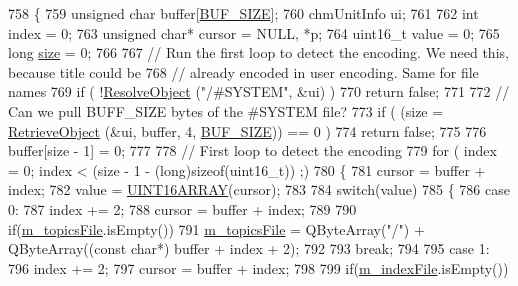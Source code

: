 \begin{DoxyCode}
758 \{
759     \textcolor{keywordtype}{unsigned} \textcolor{keywordtype}{char} buffer[\hyperlink{libchmfileimpl_8cpp_a6821bafc3c88dfb2e433a095df9940c6}{BUF\_SIZE}];
760     chmUnitInfo ui;
761     
762     \textcolor{keywordtype}{int} index = 0;
763     \textcolor{keywordtype}{unsigned} \textcolor{keywordtype}{char}* cursor = NULL, *p;
764     uint16\_t value = 0;
765     \textcolor{keywordtype}{long} \hyperlink{synctex__parser_8c_aa23c661441688350614bd6a350d2b6ff}{size} = 0;
766 
767     \textcolor{comment}{// Run the first loop to detect the encoding. We need this, because title could be}
768     \textcolor{comment}{// already encoded in user encoding. Same for file names}
769     \textcolor{keywordflow}{if} ( !\hyperlink{classLCHMFileImpl_a78d3e549251cd4c842aecca5aa1ede36}{ResolveObject} (\textcolor{stringliteral}{"/#SYSTEM"}, &ui) )
770         \textcolor{keywordflow}{return} \textcolor{keyword}{false};
771 
772     \textcolor{comment}{// Can we pull BUFF\_SIZE bytes of the #SYSTEM file?}
773     \textcolor{keywordflow}{if} ( (size = \hyperlink{classLCHMFileImpl_a8535dce5eb8f22161ecf3510fde8aa4e}{RetrieveObject} (&ui, buffer, 4, \hyperlink{libchmfileimpl_8cpp_a6821bafc3c88dfb2e433a095df9940c6}{BUF\_SIZE})) == 0 )
774         \textcolor{keywordflow}{return} \textcolor{keyword}{false};
775 
776     buffer[size - 1] = 0;
777 
778     \textcolor{comment}{// First loop to detect the encoding}
779     \textcolor{keywordflow}{for} ( index = 0; index < (size - 1 - (long)\textcolor{keyword}{sizeof}(uint16\_t)) ;)
780     \{
781         cursor = buffer + index;
782         value = \hyperlink{bitfiddle_8h_a4cdadd3f542d83f288d0b415c397fbb9}{UINT16ARRAY}(cursor);
783 
784         \textcolor{keywordflow}{switch}(value)
785         \{
786             \textcolor{keywordflow}{case} 0:
787                 index += 2;
788                 cursor = buffer + index;
789             
790                 \textcolor{keywordflow}{if}(\hyperlink{classLCHMFileImpl_af3d33a88f44e3d103f08d9cc1c0ccf12}{m\_topicsFile}.isEmpty())
791                     \hyperlink{classLCHMFileImpl_af3d33a88f44e3d103f08d9cc1c0ccf12}{m\_topicsFile} = QByteArray(\textcolor{stringliteral}{"/"}) + QByteArray((\textcolor{keyword}{const} \textcolor{keywordtype}{char}*) buffer + index + 
      2);
792                 
793                 \textcolor{keywordflow}{break};
794             
795             \textcolor{keywordflow}{case} 1:
796                 index += 2;
797                 cursor = buffer + index;
798 
799                 \textcolor{keywordflow}{if}(\hyperlink{classLCHMFileImpl_ab5f59c7a474b444bb07a1992bd0a6d82}{m\_indexFile}.isEmpty())

\end{DoxyCode}
